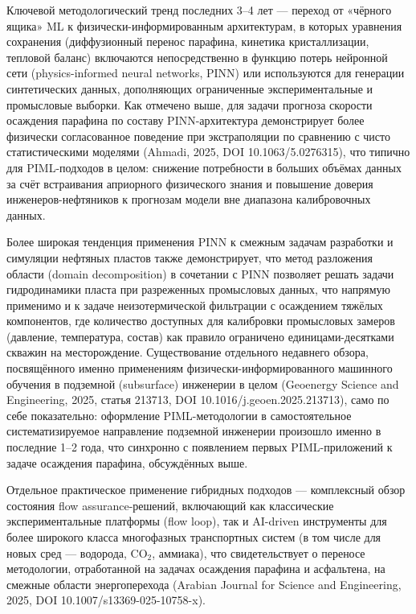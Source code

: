 \documentclass[11pt]{extarticle}
\begin{document}
Ключевой методологический тренд последних 3--4 лет --- переход от «чёрного ящика» ML к физически-информированным архитектурам, в которых уравнения сохранения (диффузионный перенос парафина, кинетика кристаллизации, тепловой баланс) включаются непосредственно в функцию потерь нейронной сети (physics-informed neural networks, PINN) или используются для генерации синтетических данных, дополняющих ограниченные экспериментальные и промысловые выборки. Как отмечено выше, для задачи прогноза скорости осаждения парафина по составу PINN-архитектура демонстрирует более физически согласованное поведение при экстраполяции по сравнению с чисто статистическими моделями (Ahmadi, 2025, DOI 10.1063/5.0276315), что типично для PIML-подходов в целом: снижение потребности в больших объёмах данных за счёт встраивания априорного физического знания и повышение доверия инженеров-нефтяников к прогнозам модели вне диапазона калибровочных данных.

Более широкая тенденция применения PINN к смежным задачам разработки и симуляции нефтяных пластов также демонстрирует, что метод разложения области (domain decomposition) в сочетании с PINN позволяет решать задачи гидродинамики пласта при разреженных промысловых данных, что напрямую применимо и к задаче неизотермической фильтрации с осаждением тяжёлых компонентов, где количество доступных для калибровки промысловых замеров (давление, температура, состав) как правило ограничено единицами-десятками скважин на месторождение. Существование отдельного недавнего обзора, посвящённого именно применениям физически-информированного машинного обучения в подземной (subsurface) инженерии в целом (Geoenergy Science and Engineering, 2025, статья 213713, DOI 10.1016/j.geoen.2025.213713), само по себе показательно: оформление PIML-методологии в самостоятельное систематизируемое направление подземной инженерии произошло именно в последние 1--2 года, что синхронно с появлением первых PIML-приложений к задаче осаждения парафина, обсуждённых выше.

Отдельное практическое применение гибридных подходов --- комплексный обзор состояния flow assurance-решений, включающий как классические экспериментальные платформы (flow loop), так и AI-driven инструменты для более широкого класса многофазных транспортных систем (в том числе для новых сред --- водорода, CO\(_2\), аммиака), что свидетельствует о переносе методологии, отработанной на задачах осаждения парафина и асфальтена, на смежные области энергоперехода (Arabian Journal for Science and Engineering, 2025, DOI 10.1007/s13369-025-10758-x).
\end{document}

